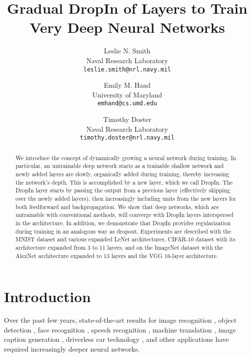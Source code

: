 \documentclass[10pt,twocolumn,letterpaper]{article}
\newcommand{\SotA}{state-of-the-art }
\newcommand{\dropin}{DropIn }
\newcommand{\dropinNS}{DropIn}
\begin{document}
\title{Gradual DropIn of Layers to Train Very Deep Neural Networks}

\author{
Leslie N. Smith\\
Naval Research Laboratory\\
{\tt\small leslie.smith@nrl.navy.mil}\\
\and
Emily M. Hand\\
University of Maryland\\
{\tt\small emhand@cs.umd.edu}
\and
Timothy Doster\\
Naval Research Laboratory\\
{\tt\small timothy.doster@nrl.navy.mil}\\
}

\maketitle

\begin{abstract}


We introduce the concept of dynamically growing a neural network during training. In particular, an untrainable deep network starts as a trainable shallow network and newly added layers are slowly, organically added during training, thereby increasing the network's depth. This is accomplished by a new layer, which we call \dropinNS. The \dropin layer starts by passing the output from a previous layer (effectively skipping over the newly added layers), then increasingly including units from the new layers for both feedforward and backpropagation. We show that deep networks, which are untrainable with conventional methods, will converge with \dropin layers interspersed in the architecture. In addition, we demonstrate that \dropin provides regularization during training in an analogous way as dropout. Experiments are described with the MNIST dataset and various expanded LeNet architectures, CIFAR-10 dataset with its architecture expanded from 3 to 11 layers, and on the ImageNet dataset with the AlexNet architecture expanded to 13 layers and the VGG 16-layer architecture.

\end{abstract}

\section{Introduction}

\label{sec:intro}

Over the past few years, \SotA results for image recognition \cite{Alexnet12,  simonyan2014very,szegedy2014going}, object detection \cite{girshick2014rich}, face recognition \cite{taigman2014deepface}, speech recognition \cite{graves2014towards}, machine translation \cite{sutskever2014sequence}, image caption generation \cite{vinyals2014show}, driverless car technology \cite{huval2015empirical}, and other applications \cite{lecun2015deep} have required increasingly deeper neural networks. 
\end{document}
